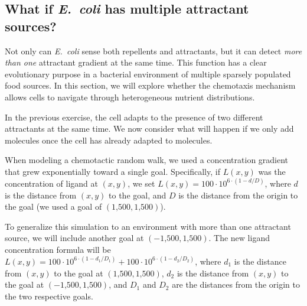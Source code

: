 \subsection{What if \textit{E.~coli} has multiple attractant sources?}

Not only can \textit{E.~coli} sense both repellents and attractants, but it can detect \textit{more than one} attractant gradient at the same time.  This function has a clear evolutionary purpose in a bacterial environment of multiple sparsely populated food sources. In this section, we will explore whether the chemotaxis mechanism allows cells to navigate through heterogeneous nutrient distributions.\\

\begin{exercise}\end{exercise}

In the previous exercise, the cell adapts to the presence of two different attractants at the same time. We now consider what will happen if we only add  molecules once the cell has already adapted to  molecules.\\

\begin{exercise}\end{exercise}

When modeling a chemotactic random walk, we used a concentration gradient that grew exponentially toward a single goal. Specifically, if $L(x,y)$ was the concentration of ligand at $(x, y)$, we set $L(x,y) = 100 \cdot 10^{6 \cdot (1-d/D)}$, where $d$ is the distance from $(x,y)$ to the goal, and $D$ is the distance from the origin to the goal (we used a goal of $(\text{1,500}, \text{1,500})$).

To generalize this simulation to an environment with more than one attractant source, we will include another goal at $(-\text{1,500}, \text{1,500})$. The new ligand concentration formula will be $L(x, y) = 100 \cdot 10^{6 \cdot (1-d_1/D_1)} + 100 \cdot 10^{6 \cdot (1-d_2/D_2)}$, where $d_1$ is the distance from $(x, y)$ to the goal at $(\text{1,500}, \text{1,500})$, $d_2$ is the distance from $(x, y)$ to the goal at $(-\text{1,500}, \text{1,500})$, and $D_1$ and $D_2$ are the distances from the origin to the two respective goals.\\

